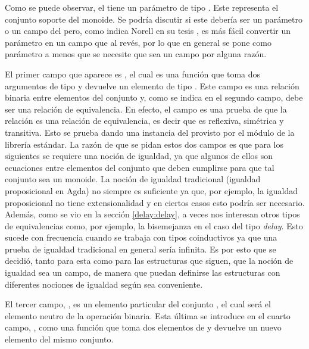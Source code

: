 
Como se puede observar, el   tiene un parámetro  de tipo . Este representa el conjunto soporte del monoide. Se podría discutir si este debería ser un parámetro o un campo del  pero, como indica Norell en su tesis \cite{norell:thesis}, es más fácil convertir un parámetro en un campo que al revés, por lo que en general se pone como parámetro a menos que se necesite que sea un campo por alguna razón.

El primer campo que aparece es , el cual es una función que toma dos argumentos de tipo  y devuelve un elemento de tipo . Este campo es una relación binaria entre elementos del conjunto  y, como se indica en el segundo campo, debe ser una relación de equivalencia. En efecto, el campo  es una prueba de que la relación  es una relación de equivalencia, es decir que es reflexiva, simétrica y transitiva. Esto se prueba dando una instancia del   provisto por el módulo  \href{https://agda.github.io/agda-stdlib/Relation.Binary.Structures.html}{} de la librería estándar. La razón de que se pidan estos dos campos es que para los siguientes se requiere una noción de igualdad, ya que algunos de ellos son ecuaciones entre elementos del conjunto  que deben cumplirse para que tal conjunto sea un monoide. La noción de igualdad tradicional (igualdad proposicional en Agda) no siempre es suficiente ya que, por ejemplo, la igualdad proposicional no tiene extensionalidad y en ciertos casos esto podría ser necesario. Además, como se vio en la sección \ref{delay:delay}, a veces nos interesan otros tipos de equivalencias como, por ejemplo, la bisemejanza en el caso del tipo \textit{delay}. Esto sucede con frecuencia cuando se trabaja con tipos coinductivos ya que una prueba de igualdad tradicional en general sería infinita. Es por esto que se decidió, tanto para esta como para las estructuras que siguen, que la noción de igualdad sea un campo, de manera que puedan definirse las estructuras con diferentes nociones de igualdad según sea conveniente. 

El tercer campo, , es un elemento particular del conjunto , el cual será el elemento neutro de la operación binaria. Esta última se introduce en el cuarto campo, , como una función que toma dos elementos de  y devuelve un nuevo elemento del mismo conjunto. 

